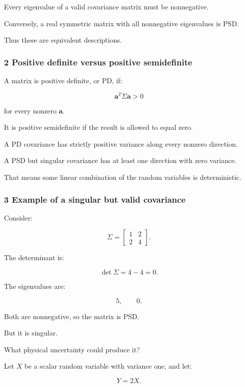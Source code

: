 Every eigenvalue of a valid covariance matrix must be nonnegative.

Conversely, a real symmetric matrix with all nonnegative eigenvalues is PSD.

Thus these are equivalent descriptions.

\subsubsection{2 Positive definite versus positive semidefinite}\label{02-foundations-ii-ch024-positive-definite-versus-positive-semidefinite}

A matrix is positive definite, or PD, if:

\[
 \mathbf a^T\Sigma\mathbf a>0
\]

for every nonzero \(\mathbf a\).

It is positive semidefinite if the result is allowed to equal zero.

A PD covariance has strictly positive variance along every nonzero direction.

A PSD but singular covariance has at least one direction with zero variance.

That means some linear combination of the random variables is deterministic.

\subsubsection{3 Example of a singular but valid covariance}\label{02-foundations-ii-ch024-example-of-a-singular-but-valid-covariance}

Consider:

\[
 \boxed{ \Sigma= \begin{bmatrix} 1&2\\ 2&4 \end{bmatrix} }.
\]

The determinant is:

\[
 \det\Sigma=4-4=0.
\]

The eigenvalues are:

\[
 5,\qquad0.
\]

Both are nonnegative, so the matrix is PSD.

But it is singular.

What physical uncertainty could produce it?

Let \(X\) be a scalar random variable with variance one, and let:

\[
 Y=2X.
\]

